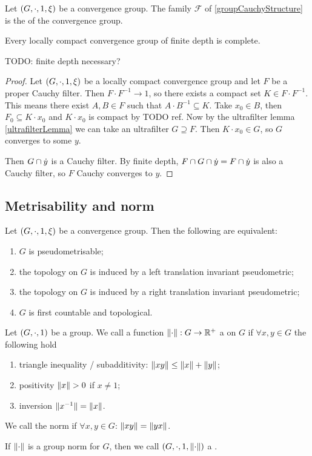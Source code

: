 \begin{definition}
Let $\left( G, \cdot, 1, \xi \right)$ be a convergence group. The family $\mathcal{F}$ of \ref{groupCauchyStructure} is the  of the convergence group.
\end{definition}

\begin{proposition}
Every locally compact convergence group of finite depth is complete.
\end{proposition}
TODO: finite depth necessary?
\begin{proof}
Let $\left( G, \cdot, 1, \xi \right)$ be a locally compact convergence group and let $F$ be a proper Cauchy filter. Then $F\cdot F^{-1} \to 1$, so there exists a compact set $K\in F\cdot F^{-1}$. This means there exist $A, B \in F$ such that $A\cdot B^{-1} \subseteq K$. Take $x_0 \in B$, then $F_0 \subseteq K\cdot x_0$ and $K\cdot x_0$ is compact by TODO ref. Now by the ultrafilter lemma \ref{ultrafilterLemma} we can take an ultrafilter $G \supseteq F$. Then $K\cdot x_0 \in G$, so $G$ converges to some $y$.

Then $G \cap \dot{y}$ is a Cauchy filter. By finite depth, $F\cap G \cap \dot{y} = F\cap \dot{y}$ is also a Cauchy filter, so $F$ Cauchy converges to $y$.
\end{proof}

\subsection{Metrisability and norm}

\begin{theorem}
Let $\left( G,\cdot, 1, \xi \right)$ be a convergence group. Then the following are equivalent:
\begin{enumerate}
\item $G$ is pseudometrisable;
\item the topology on $G$ is induced by a left translation invariant pseudometric;
\item the topology on $G$ is induced by a right translation invariant pseudometric;
\item $G$ is first countable and topological.
\end{enumerate}
\end{theorem}

\begin{definition}
Let $\left( G, \cdot, 1 \right)$ be a group. We call a function $\lVert\cdot\rVert: G\to \mathbb{R}^+$ a  on $G$ if $\forall x,y\in G$ the following hold
\begin{enumerate}
\item triangle inequality / subadditivity: $\lVert xy\rVert \leq \lVert x\rVert + \lVert y\rVert$;
\item positivity $\lVert x\rVert > 0$ if $x \neq 1$;
\item inversion $\lVert x^{-1}\rVert = \lVert x\rVert$.
\end{enumerate}
We call the norm  if $\forall x,y\in G$: $\lVert xy\rVert = \lVert yx\rVert$.

If $\lVert\cdot\rVert$ is a group norm for $G$, then we call $\left( G, \cdot, 1, \lVert\cdot\rVert \right)$ a .
\end{definition}
